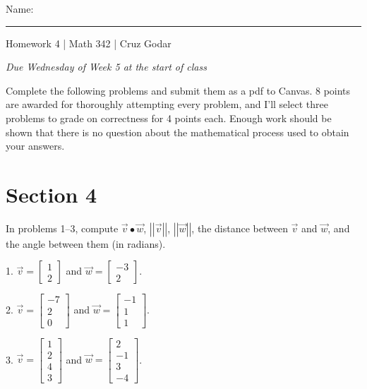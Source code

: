 \documentclass{article}
\begin{document}
\Large Name: \rule{2in}{0.15mm} \hfill Homework 4 | Math 342 | Cruz Godar \vspace{4pt} \normalsize

\textit{Due Wednesday of Week 5 at the start of class}

Complete the following problems and submit them as a pdf to Canvas. 8 points are awarded for thoroughly attempting every problem, and I'll select three problems to grade on correctness for 4 points each. Enough work should be shown that there is no question about the mathematical process used to obtain your answers.

\section{Section 4}

In problems 1--3, compute $\vec{v} \bullet \vec{w}$, $\left| \left| \vec{v} \right| \right|$, $\left| \left| \vec{w} \right| \right|$, the distance between $\vec{v}$ and $\vec{w}$, and the angle between them (in radians).

1. $\vec{v} = \left[\begin{array}{c} 1 \\ 2 \end{array}\right]$ and $\vec{w} = \left[\begin{array}{c} -3 \\ 2 \end{array}\right]$.

2. $\vec{v} = \left[\begin{array}{c} -7 \\ 2 \\ 0 \end{array}\right]$ and $\vec{w} = \left[\begin{array}{c} -1 \\ 1 \\ 1 \end{array}\right]$.

3. $\vec{v} = \left[\begin{array}{c} 1 \\ 2 \\ 4 \\ 3 \end{array}\right]$ and $\vec{w} = \left[\begin{array}{c} 2 \\ -1 \\ 3 \\ -4 \end{array}\right]$.
\end{document}
